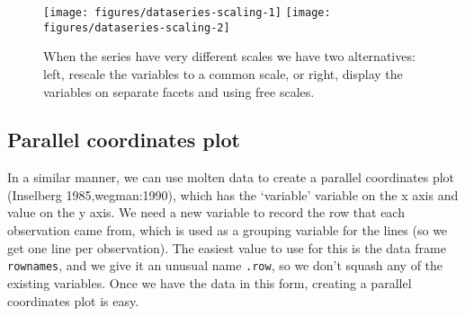\begin{Shaded}
\begin{Highlighting}[]
\StringTok{ }
  \StringTok{ } \NormalTok{)}
  \StringTok{ }\NormalTok{rng[}\NormalTok{]) /}\StringTok{ }
\NormalTok{\}}
\StringTok{ } 
  \NormalTok{, }
    
  \NormalTok{) +}\StringTok{ }
\StringTok{  }\StringTok{ } \NormalTok{)}
\end{Highlighting}
\end{Shaded}

\begin{figure}
\texttt{[image: figures/dataseries-scaling-1]} \texttt{[image: figures/dataseries-scaling-2]} \caption{When the series have very different scales we have two alternatives: left, rescale the variables to a common scale, or right, display the variables on separate facets and using free scales.\label{fig:series-scaling}}
\end{figure}

\subsection{Parallel coordinates plot}\label{sub:molten-data}

In a similar manner, we can use molten data to create a parallel
coordinates plot (Inselberg 1985,wegman:1990), which has the `variable'
variable on the x axis and value on the y axis. We need a new variable
to record the row that each observation came from, which is used as a
grouping variable for the lines (so we get one line per observation).
The easiest value to use for this is the data frame \texttt{rownames},
and we give it an unusual name \texttt{.row}, so we don't squash any of
the existing variables. Once we have the data in this form, creating a
parallel coordinates plot is easy. 

